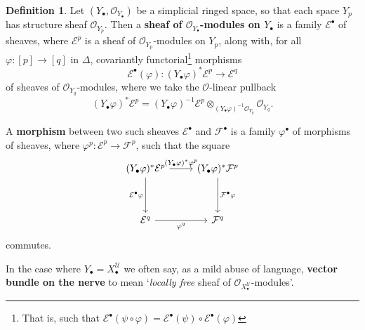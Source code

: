 \documentclass[11pt,fleqn]{article}
\theoremstyle{plain}
\theoremstyle{definition}
\newtheorem{definition}[theorem]{Definition}
\theoremstyle{remark}
\numberwithin{equation}{theorem}
\newcommand{\cover}{\mathcal{U}}
\newcommand{\OO}{\mathcal{O}}
\newcommand{\define}[1]{\textbf{#1}}
\newcommand{\nerve}[1]{X_{#1}^\cover}
\begin{document}
        \begin{definition}\label{definition:sheaf-on-a-simplicial-space}
            Let $(Y_\bullet,\OO_{Y_\bullet})$ be a simplicial ringed space, so that each space $Y_p$ has structure sheaf $\OO_{Y_p}$.
            Then a \define{sheaf of $\OO_{Y_\bullet}$-modules on $Y_\bullet$} is a family $\mathcal{E}^\bullet$ of sheaves, where $\mathcal{E}^p$ is a sheaf of $\OO_{Y_p}$-modules on $Y_p$, along with, for all $\varphi\colon[p]\to[q]$ in $\Delta$, covariantly functorial\footnote{That is, such that $\mathcal{E}^\bullet(\psi\circ\varphi) = \mathcal{E}^\bullet(\psi)\circ \mathcal{E}^\bullet(\varphi)$} morphisms
            \[
                \mathcal{E}^\bullet(\varphi) \colon (Y_\bullet\varphi)^*\mathcal{E}^p \to \mathcal{E}^q
            \]
            of sheaves of $\OO_{Y_q}$-modules, where we take the $\OO$-linear pullback
            \[
                (Y_\bullet\varphi)^*\mathcal{E}^p
                =
                (Y_\bullet\varphi)^{-1}\mathcal{E}^p
                \otimes_{(Y_\bullet\varphi)^{-1}\OO_{Y_p}}
                \OO_{Y_q}.
            \]

            A \define{morphism} between two such sheaves $\mathcal{E}^\bullet$ and $\mathcal{F}^\bullet$ is a family $\varphi^\bullet$ of morphisms of sheaves, where $\varphi^p\colon \mathcal{E}^p\to \mathcal{F}^p$, such that the square
            \[
                \begin{tikzcd}[row sep=huge]
                    (Y_\bullet\varphi)^*\mathcal{E}^p
                        \ar[r,"(Y_\bullet\varphi)^*\varphi^p"]
                        \ar[d,swap,"\mathcal{E}^\bullet\varphi"]
                &   (Y_\bullet\varphi)^*\mathcal{F}^p
                        \ar[d,"\mathcal{F}^\bullet\varphi"]
                \\  \mathcal{E}^q
                        \ar[r,swap,"\varphi^q"]
                &   \mathcal{F}^q
                \end{tikzcd}
            \]
            commutes.

            In the case where $Y_\bullet=\nerve{\bullet}$ we often say, as a mild abuse of language, \define{vector bundle on the nerve} to mean `\emph{locally free} sheaf of $\OO_{\nerve{\bullet}}$-modules'.
        \end{definition}
\end{document}
